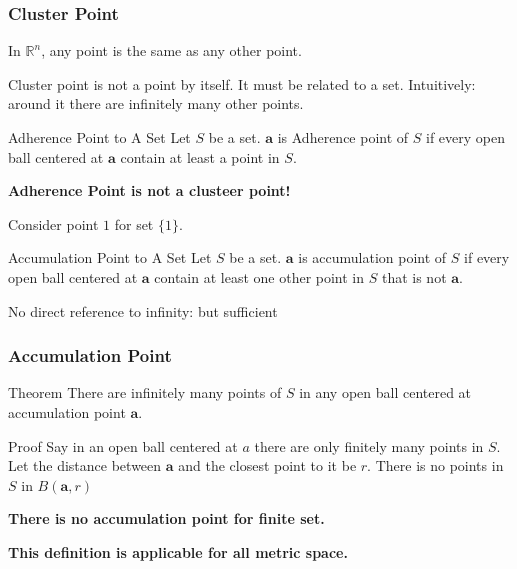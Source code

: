 \documentclass{beamer}
\begin{document}
\begin{frame}
\frametitle{Cluster Point}

In $\mathbb{R}^n$, any point is the same as any other point.

Cluster point is not a point by itself. It must be related to a set.
Intuitively: around it there are infinitely many other points.

\begin{block}{Adherence Point to A Set}
	Let $S$ be a set.
	$\bm{a}$ is Adherence point of $S$ if every open ball centered at $\bm{a}$ contain at least a point in $S$.
\end{block}

\textbf{Adherence Point is not a clusteer point!}

Consider point $1$ for set $\{ 1 \}$.

\begin{block}{Accumulation Point to A Set}
	Let $S$ be a set.
	$\bm{a}$ is accumulation point of $S$ if every open ball centered at $\bm{a}$ contain at least one other point in $S$ that is not $\bm{a}$.
\end{block}

No direct reference to infinity: but sufficient

\end{frame}

\begin{frame}
\frametitle{Accumulation Point}
	\begin{alertblock}{Theorem}
		There are infinitely many points of $S$ in any open ball centered at accumulation point $\bm{a}$.
	\end{alertblock}

	\begin{block}{Proof}
		Say in an open ball centered at $a$ there are only finitely many points in $S$. 
		Let the distance between $\bm{a}$ and the closest point to it be $r$.
		There is no points in $S$ in $B(\bm{a},r)$
		\begin{figure}
		\end{figure}
	\end{block}

	\textbf{There is no accumulation point for finite set.}

	\textbf{This definition is applicable for all metric space.}
\end{frame}
\end{document}
